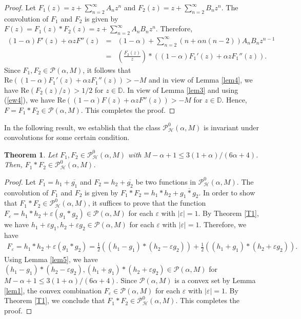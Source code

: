 \documentclass[11pt,reqno]{amsart}
\newtheorem{theo}{Theorem}[section]
\newtheorem{open problem}{Open problem}[section]
\newcommand{\ol}{\overline}
\newcommand{\beas}{\begin{eqnarray*}}
\newcommand{\eeas}{\end{eqnarray*}}
\newcommand{\bea}{\begin{eqnarray}}
\newcommand{\eea}{\end{eqnarray}}
\renewcommand{\epsilon}{\varepsilon}
\numberwithin{equation}{section}
\begin{document}
\begin{proof} Let $F_1(z)=z+\sum_{n=2}^\infty A_nz^n$ and $F_2(z)=z+\sum_{n=2}^\infty B_nz^n$. The convolution of $F_1$ and $F_2$ is given by $F(z)=F_1(z)*F_2(z)=z+\sum_{n=2}^\infty A_nB_nz^n$.
Therefore,
\bea\label{ew4} (1-\alpha)F'(z)+ \alpha zF''(z)&=&(1-\alpha)+\sum_{n=2}^\infty (n+\alpha n(n-2))A_nB_nz^{n-1}\nonumber\\
&=&\left(\frac{F_2(z)}{z}\right)*\left((1-\alpha)F_1'(z)+ \alpha zF_1''(z)\right).\eea
Since $F_1, F_2\in\mathcal{P}(\alpha, M)$, it follows that $\text{Re}\left((1-\alpha)F_1'(z)+ \alpha zF_1''(z)\right)>-M$ and in view of \textrm{Lemma \ref{lem4}}, we have $\text{Re}\left(F_2(z)/z\right)>1/2$ for $z\in\mathbb{D}$.
In view of \textrm{Lemma \ref{lem3}} and using (\ref{ew4}), we have $\text{Re}\left((1-\alpha)F(z)+ \alpha zF''(z)\right)>-M$ for $z\in\mathbb{D}$. Hence, $F=F_1*F_2\in\mathcal{P}(\alpha, M)$. This completes the proof.
 \end{proof}
  In the following result, we establish that the class $\mathcal{P}_{\mathcal{H}}^0(\alpha,M)$ is invariant under convolutions for some certain condition.
\begin{theo}\label{CTh2} Let $F_1,F_2\in\mathcal{P}_{\mathcal{H}}^0(\alpha,M)$ with $M-\alpha+1\leq 3(1+\alpha)/(6\alpha+4)$. Then, $F_1*F_2\in\mathcal{P}_{\mathcal{H}}^0(\alpha,M)$.\end{theo}
\begin{proof} Let $F_1=h_1+\ol{g_1}$ and $F_2=h_2+\ol{g_2}$ be two functions in $\mathcal{P}_{\mathcal{H}}^0(\alpha,M)$. The convolution of $F_1$ and $F_2$ is given by
$F_1*F_2=h_1*h_2+\ol{g_1*g_2}$. In order to show that $F_1*F_2\in\mathcal{P}_{\mathcal{H}}^0(\alpha,M)$, it suffices to prove that the function
$F_\epsilon=h_1*h_2+\epsilon\left( g_1*g_2\right)\in\mathcal{P}(\alpha, M)$ for each $\epsilon$ with $|\epsilon|=1$. 
By \textrm{Theorem \ref{T1}}, we have $h_1+\epsilon g_1, h_2+\epsilon g_2\in\mathcal{P}(\alpha, M)$ for each $\epsilon$ with $|\epsilon|=1$. Therefore, we have
\beas F_\epsilon=h_1*h_2+\epsilon\left( g_1*g_2\right)=\frac{1}{2}\left((h_1-g_1)*(h_2-\epsilon g_2)\right)+\frac{1}{2}\left((h_1+g_1)*(h_2+\epsilon g_2)\right).\eeas
Using \textrm{Lemma \ref{lem5}}, we have $(h_1-g_1)*(h_2-\epsilon g_2), (h_1+g_1)*(h_2+\epsilon g_2)\in\mathcal{P}(\alpha, M)$ for $M-\alpha+1\leq 3(1+\alpha)/(6\alpha+4)$. 
Since $\mathcal{P}(\alpha, M)$ is a convex set by \textrm{Lemma} \ref{lem1}, the convex combination $F_\epsilon \in\mathcal{P}(\alpha, M)$ for each $\epsilon$ with $|\epsilon|=1$. By \textrm{Theorem} \ref{T1}, we conclude that 
$F_1 * F_2 \in \mathcal{P}^{0}_{\mathcal{H}}(\alpha, M)$. This completes the proof.
 \end{proof}
\end{document}
